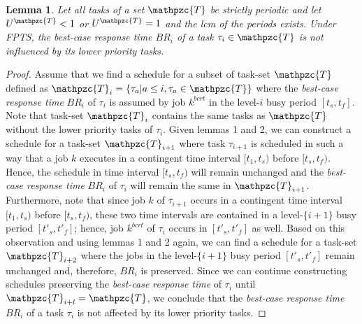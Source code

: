 \documentclass[fleqn]{article}
\newtheorem{lemma}{Lemma}
\begin{document}

\begin{lemma}
	Let all tasks of a set $\mathpzc{T}$ be strictly periodic and let $U^{\mathpzc{T}}<1$ or $U^{\mathpzc{T}}=1$ and the lcm of the periods exists. Under FPTS, the best-case response time $BR_i$ of a task $\tau_i \in \mathpzc{T}$ is not influenced by its lower priority tasks.
\end{lemma}

\begin{proof}
	Assume that we find a schedule for a subset of task-set $\mathpzc{T}$ defined as $\mathpzc{T}_i = \{\tau_a | a \leq i, \tau_a \in \mathpzc{T}\}$ where the \textit{best-case response time} $BR_i$ of $\tau_i$ is assumed by job $k^{bcrt}$ in the level-$i$ busy period $[t_{s},t_{f}]$. Note that task-set $\mathpzc{T}_i$ contains the same tasks as $\mathpzc{T}$ without the lower priority tasks of $\tau_i$. Given lemmas 1 and 2, we can construct a schedule for a task-set $\mathpzc{T}_{i+1}$ where task $\tau_{i+1}$ is scheduled in such a way that a job $k$ executes in a contingent time interval $[t_1, t_s)$ before $[t_s,t_f)$. Hence, the schedule in time interval $[t_s,t_f)$ will remain unchanged and the \textit{best-case response time} $BR_i$ of $\tau_i$ will remain the same in $\mathpzc{T}_{i+1}$. Furthermore, note that since job $k$ of $\tau_{i+1}$ occurs in a contingent time interval $[t_1, t_s)$ before $[t_s,t_f)$, these two time intervals are contained in a level-$\{i+1\}$ busy period $[t\prime_s,t\prime_f]$; hence, job $k^{bcrt}$ of $\tau_i$ occurs in $[t\prime_s,t\prime_f]$ as well. Based on this observation and using lemmas 1 and 2 again, we can find a schedule for a task-set $\mathpzc{T}_{i+2}$ where the jobs in the  level-$\{i+1\}$ busy period $[t\prime_s,t\prime_f]$ remain unchanged and, therefore, $BR_i$ is preserved. Since we can continue constructing schedules preserving the \textit{best-case response time} of $\tau_i$ until $\mathpzc{T}_{i+l} = \mathpzc{T}$, we conclude that the \textit{best-case response time} $BR_i$ of a task $\tau_i$ is not affected by its lower priority tasks.
\end{proof}
\end{document}
